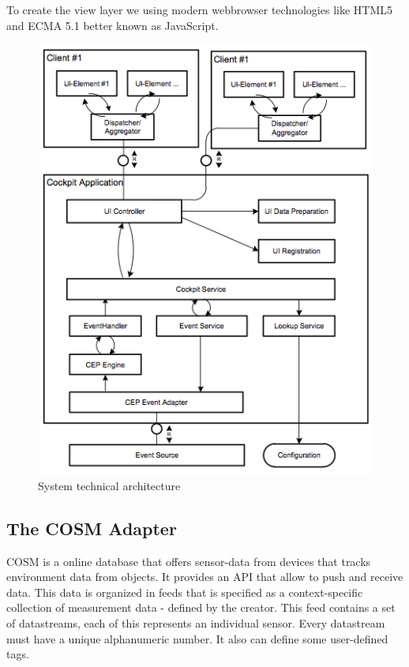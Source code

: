 \documentclass{acm_proc_article-sp}
\begin{document}
To create the view layer we using modern webbrowser technologies like HTML5 and ECMA 5.1 better known as JavaScript.

\begin{figure}[h]
	\begin{center}
		\includegraphics[scale=0.5]{sta.png}
		\caption[System technical architecture]{System technical architecture}
		\label{fig:SystemTechnicalArchitecture}
	\end{center}
\end{figure}

\subsection{The COSM Adapter}
COSM is a online database that offers sensor-data from devices that tracks environment data from objects. It provides an API that allow to push and receive data.
This data is organized in feeds that is specified as a context-specific collection of measurement data - defined by the creator. This feed contains a set of datastreams, each of this represents an individual sensor. Every datastream must have a unique alphanumeric number. It also can define some user-defined tags.
\end{document}

